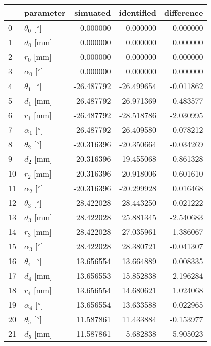 \documentclass{standalone}%
\begin{document}
%
\normalsize%
\begin{tabular}{llrrr}
\toprule
{} &                 parameter &   simuated & identified & difference \\
\midrule
0  &  $\theta_{0}$ [$\degree$] &   0.000000 &   0.000000 &   0.000000 \\
1  &              $d_{0}$ [mm] &   0.000000 &   0.000000 &   0.000000 \\
2  &              $r_{0}$ [mm] &   0.000000 &   0.000000 &   0.000000 \\
3  &  $\alpha_{0}$ [$\degree$] &   0.000000 &   0.000000 &   0.000000 \\
4  &  $\theta_{1}$ [$\degree$] & -26.487792 & -26.499654 &  -0.011862 \\
5  &              $d_{1}$ [mm] & -26.487792 & -26.971369 &  -0.483577 \\
6  &              $r_{1}$ [mm] & -26.487792 & -28.518786 &  -2.030995 \\
7  &  $\alpha_{1}$ [$\degree$] & -26.487792 & -26.409580 &   0.078212 \\
8  &  $\theta_{2}$ [$\degree$] & -20.316396 & -20.350664 &  -0.034269 \\
9  &              $d_{2}$ [mm] & -20.316396 & -19.455068 &   0.861328 \\
10 &              $r_{2}$ [mm] & -20.316396 & -20.918006 &  -0.601610 \\
11 &  $\alpha_{2}$ [$\degree$] & -20.316396 & -20.299928 &   0.016468 \\
12 &  $\theta_{3}$ [$\degree$] &  28.422028 &  28.443250 &   0.021222 \\
13 &              $d_{3}$ [mm] &  28.422028 &  25.881345 &  -2.540683 \\
14 &              $r_{3}$ [mm] &  28.422028 &  27.035961 &  -1.386067 \\
15 &  $\alpha_{3}$ [$\degree$] &  28.422028 &  28.380721 &  -0.041307 \\
16 &  $\theta_{4}$ [$\degree$] &  13.656554 &  13.664889 &   0.008335 \\
17 &              $d_{4}$ [mm] &  13.656553 &  15.852838 &   2.196284 \\
18 &              $r_{4}$ [mm] &  13.656554 &  14.680621 &   1.024068 \\
19 &  $\alpha_{4}$ [$\degree$] &  13.656554 &  13.633588 &  -0.022965 \\
20 &  $\theta_{5}$ [$\degree$] &  11.587861 &  11.433884 &  -0.153977 \\
21 &              $d_{5}$ [mm] &  11.587861 &   5.682838 &  -5.905023 \\

\end{tabular}
\end{document}
